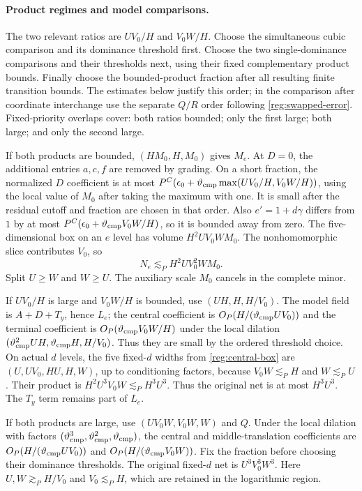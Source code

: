 \documentclass[11pt]{amsart}
\theoremstyle{definition}
\theoremstyle{remark}
\numberwithin{equation}{section}
\begin{document}
\paragraph{Product regimes and model comparisons.}
The two relevant ratios are $UV_0/H$ and $V_0W/H$. Choose the simultaneous cubic comparison and its dominance threshold first. Choose the two single-dominance comparisons and their thresholds next, using their fixed complementary product bounds. Finally choose the bounded-product fraction after all resulting finite transition bounds. The estimates below justify this order; in the comparison after coordinate interchange use the separate $Q/R$ order following \eqref{reg:swapped-error}. Fixed-priority overlaps cover: both ratios bounded; only the first large; both large; and only the second large.

If both products are bounded, $(HM_0,H,M_0)$ gives $M_e$. At $D=0$, the additional entries $a,c,f$ are removed by grading. On a short fraction, the normalized $D$ coefficient is at most $P^C(\epsilon_0+\vartheta_{\rm cmp}\max(UV_0/H,V_0W/H))$, using the local value of $M_0$ after taking the maximum with one. It is small after the residual cutoff and fraction are chosen in that order. Also $e'=1+d\gamma$ differs from $1$ by at most $P^C(\epsilon_0+\vartheta_{\rm cmp} V_0W/H)$, so it is bounded away from zero. The five-dimensional box on an $e$ level has volume $H^2UV_0WM_0$. The nonhomomorphic slice contributes $V_0$, so
\[
N_e\lesssim_PH^2UV_0^2WM_0.
\]
Split $U\ge W$ and $W\ge U$. The auxiliary scale $M_0$ cancels in the complete minor.

If $UV_0/H$ is large and $V_0W/H$ is bounded, use $(UH,H,H/V_0)$. The model field is $A+D+T_y$, hence $L_e$; the central coefficient is $O_P(H/(\vartheta_{\rm cmp} UV_0))$ and the terminal coefficient is $O_P(\vartheta_{\rm cmp} V_0W/H)$ under the local dilation $(\vartheta_{\rm cmp}^2UH,\vartheta_{\rm cmp} H,H/V_0)$. Thus they are small by the ordered threshold choice. On actual $d$ levels, the five fixed-$d$ widths from \eqref{reg:central-box} are $(U,UV_0,HU,H,W)$, up to conditioning factors, because $V_0W\lesssim_PH$ and $W\lesssim_PU$. Their product is $H^2U^3V_0W\lesssim_PH^3U^3$. Thus the original net is at most $H^3U^3$. The $T_y$ term remains part of $L_e$.

If both products are large, use $(UV_0W,V_0W,W)$ and $Q$. Under the local dilation with factors $(\vartheta_{\rm cmp}^3,\vartheta_{\rm cmp}^2,\vartheta_{\rm cmp})$, the central and middle-translation coefficients are $O_P(H/(\vartheta_{\rm cmp} UV_0))$ and $O_P(H/(\vartheta_{\rm cmp} V_0W))$. Fix the fraction before choosing their dominance thresholds. The original fixed-$d$ net is $U^3V_0^3W^3$. Here $U,W\gtrsim_PH/V_0$ and $V_0\lesssim_PH$, which are retained in the logarithmic region.
\end{document}
